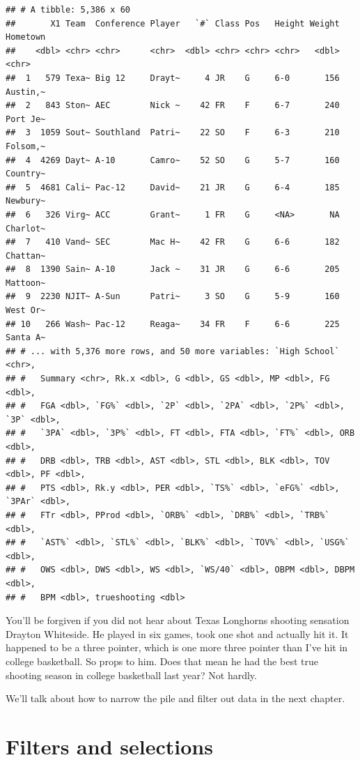\documentclass[]{book}
\begin{document}
\begin{verbatim}
## # A tibble: 5,386 x 60
##       X1 Team  Conference Player   `#` Class Pos   Height Weight Hometown
##    <dbl> <chr> <chr>      <chr>  <dbl> <chr> <chr> <chr>   <dbl> <chr>   
##  1   579 Texa~ Big 12     Drayt~     4 JR    G     6-0       156 Austin,~
##  2   843 Ston~ AEC        Nick ~    42 FR    F     6-7       240 Port Je~
##  3  1059 Sout~ Southland  Patri~    22 SO    F     6-3       210 Folsom,~
##  4  4269 Dayt~ A-10       Camro~    52 SO    G     5-7       160 Country~
##  5  4681 Cali~ Pac-12     David~    21 JR    G     6-4       185 Newbury~
##  6   326 Virg~ ACC        Grant~     1 FR    G     <NA>       NA Charlot~
##  7   410 Vand~ SEC        Mac H~    42 FR    G     6-6       182 Chattan~
##  8  1390 Sain~ A-10       Jack ~    31 JR    G     6-6       205 Mattoon~
##  9  2230 NJIT~ A-Sun      Patri~     3 SO    G     5-9       160 West Or~
## 10   266 Wash~ Pac-12     Reaga~    34 FR    F     6-6       225 Santa A~
## # ... with 5,376 more rows, and 50 more variables: `High School` <chr>,
## #   Summary <chr>, Rk.x <dbl>, G <dbl>, GS <dbl>, MP <dbl>, FG <dbl>,
## #   FGA <dbl>, `FG%` <dbl>, `2P` <dbl>, `2PA` <dbl>, `2P%` <dbl>, `3P` <dbl>,
## #   `3PA` <dbl>, `3P%` <dbl>, FT <dbl>, FTA <dbl>, `FT%` <dbl>, ORB <dbl>,
## #   DRB <dbl>, TRB <dbl>, AST <dbl>, STL <dbl>, BLK <dbl>, TOV <dbl>, PF <dbl>,
## #   PTS <dbl>, Rk.y <dbl>, PER <dbl>, `TS%` <dbl>, `eFG%` <dbl>, `3PAr` <dbl>,
## #   FTr <dbl>, PProd <dbl>, `ORB%` <dbl>, `DRB%` <dbl>, `TRB%` <dbl>,
## #   `AST%` <dbl>, `STL%` <dbl>, `BLK%` <dbl>, `TOV%` <dbl>, `USG%` <dbl>,
## #   OWS <dbl>, DWS <dbl>, WS <dbl>, `WS/40` <dbl>, OBPM <dbl>, DBPM <dbl>,
## #   BPM <dbl>, trueshooting <dbl>
\end{verbatim}

You'll be forgiven if you did not hear about Texas Longhorns shooting sensation Drayton Whiteside. He played in six games, took one shot and actually hit it. It happened to be a three pointer, which is one more three pointer than I've hit in college basketball. So props to him. Does that mean he had the best true shooting season in college basketball last year? Not hardly.

We'll talk about how to narrow the pile and filter out data in the next chapter.

\hypertarget{filters-and-selections}{%
\chapter{Filters and selections}\label{filters-and-selections}}
\end{document}
